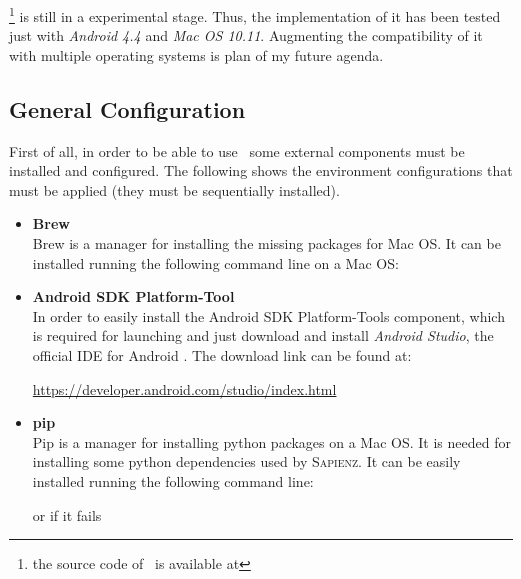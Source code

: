 \toolname\footnote{the source code of \toolname\ is available at \toolurl } is still in a experimental stage. Thus, the implementation of it has been tested just with \textit{Android 4.4} and \textit{Mac OS 10.11}. 
Augmenting the compatibility of it with multiple operating systems is plan of my future agenda. 

\subsection{General Configuration}
First of all, in order to be able to use \toolname\ some external components must be installed and configured. 
The following shows the environment configurations that must be applied (they must be sequentially installed).
\begin{itemize}
\item \textbf{Brew} \\
Brew \cite{brew} is a manager for installing the missing packages for Mac OS. 
It can be installed running the following command line on a Mac OS: 
{\tiny
\begin{center}
\end{center}
}%
\item \textbf{Android SDK Platform-Tool}\\
In order to easily install the Android SDK Platform-Tools component, which is required for launching \sapienz and \monkey just download and install \textit{Android Studio}, the official IDE for Android \cite{androidstudio}. 
The download link can be found at:  
\begin{center}
\url{https://developer.android.com/studio/index.html}
\end{center}
\item \textbf{pip} \\
Pip is a manager for installing python packages on a Mac OS. It is needed for installing some python dependencies used by \textsc{Sapienz}.  
It can be easily installed running the following command line: 	
\begin{center}
\end{center}
\begin{center}
or if it fails
\end{center}
\begin{center}
\end{center}

\end{itemize}

